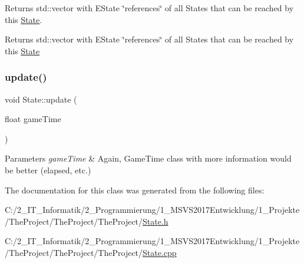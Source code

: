 Returns std\+::vector with E\+State \char`\"{}references\char`\"{} of all States that can be reached by this \mbox{\hyperlink{class_state}{State}}. 

\begin{DoxyReturn}{Returns}
std\+::vector with E\+State \char`\"{}references\char`\"{} of all States that can be reached by this \mbox{\hyperlink{class_state}{State}} 
\end{DoxyReturn}
\mbox{\label{class_state_adfaddb5aedfeca338af219798b37ff60}} 
\subsubsection{\texorpdfstring{update()}{update()}}
{\footnotesize\ttfamily void State\+::update (\begin{DoxyParamCaption}\item[{float}]{game\+Time }\end{DoxyParamCaption})}


\begin{DoxyParams}{Parameters}
{\em game\+Time} & Again, Game\+Time class with more information would be better (elapsed, etc.) \\
\hline
\end{DoxyParams}


The documentation for this class was generated from the following files\+:\begin{DoxyCompactItemize}
\item 
C\+:/2\+\_\+\+I\+T\+\_\+\+Informatik/2\+\_\+\+Programmierung/1\+\_\+\+M\+S\+V\+S2017\+Entwicklung/1\+\_\+\+Projekte/\+The\+Project/\+The\+Project/\+The\+Project/\mbox{\hyperlink{_state_8h}{State.\+h}}\item 
C\+:/2\+\_\+\+I\+T\+\_\+\+Informatik/2\+\_\+\+Programmierung/1\+\_\+\+M\+S\+V\+S2017\+Entwicklung/1\+\_\+\+Projekte/\+The\+Project/\+The\+Project/\+The\+Project/\mbox{\hyperlink{_state_8cpp}{State.\+cpp}}\end{DoxyCompactItemize}
